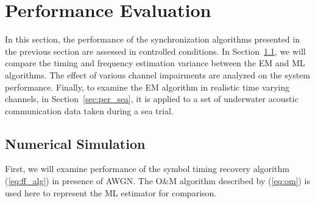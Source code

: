 \documentclass[journal,comsoc, onecolumn, 12pt,draftclsnofoot]{IEEEtran} %
\begin{document}



\section{Performance Evaluation}
\label{sec:perfo}
In this section, the performance of the synchronization algorithms presented in the previous section are assessed in controlled conditions.
In Section~\ref{sec:per_sim}, we will compare the timing and frequency estimation variance between the EM and ML algorithms.
The effect of various channel impairments
are analyzed on the system performance.
Finally, to examine the EM algorithm in realistic time varying channels, in Section~\ref{sec:per_sea}, it is applied to a set of underwater acoustic communication data taken during a sea trial.

\subsection{Numerical Simulation}
\label{sec:per_sim}
First, we will examine performance of the symbol timing recovery algorithm (\ref{eq:ff_alg}) in presence of AWGN.
The O\&M algorithm
described by (\ref{eq:om})
is used here to represent the ML estimator for comparison.
\end{document}
